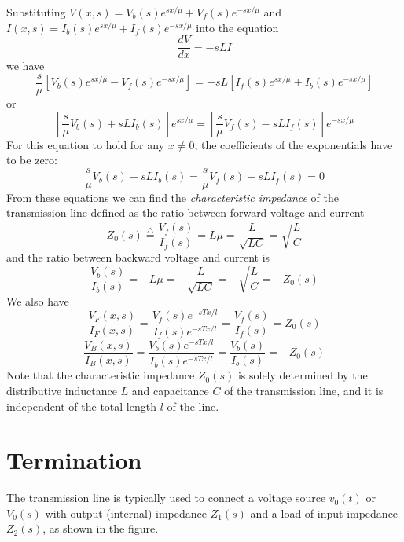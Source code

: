 Substituting $V(x,s)=V_b(s)e^{sx/\mu}+V_f(s)e^{-sx/\mu}$ and
$I(x,s)=I_b(s)e^{sx/\mu}+I_f(s)e^{-sx/\mu}$ into the equation
\[	\frac{dV}{dx}=-sLI	\]
we have
\[	\frac{s}{\mu}[V_b(s)e^{sx/\mu}-V_f(s)e^{-sx/\mu}]
	=-sL[I_f(s)e^{sx/\mu}+I_b(s)e^{-sx/\mu}]	\]
or 
\[ \left[\frac{s}{\mu}V_b(s)+sLI_b(s)\right]e^{sx/\mu}=
	\left[\frac{s}{\mu}V_f(s)-sLI_f(s)\right]e^{-sx/\mu}	\]
For this equation to hold for any $x\ne 0$, the coefficients of the
exponentials have to be zero:
\[	\frac{s}{\mu}V_b(s)+sLI_b(s)=\frac{s}{\mu}V_f(s)-sLI_f(s)=0 \]
From these equations we can find the {\em characteristic impedance} 
of the transmission line defined as the ratio between forward voltage 
and current
\[	Z_0(s)\stackrel{\triangle}{=}\frac{V_f(s)}{I_f(s)}
	=L\mu=\frac{L}{\sqrt{LC}}=\sqrt{\frac{L}{C}}	\]
and the ratio between backward voltage and current is
\[	\frac{V_b(s)}{I_b(s)}=-L\mu=-\frac{L}{\sqrt{LC}}
	=-\sqrt{\frac{L}{C}}=-Z_0(s)	\]
We also have
\[	\frac{V_F(x,s)}{I_F(x,s)}
	=\frac{V_f(s)e^{-sTx/l}}{I_f(s)e^{-sTx/l}}
	=\frac{V_f(s)}{I_f(s)}=Z_0(s)	\]
\[	\frac{V_B(x,s)}{I_B(x,s)}
	=\frac{V_b(s)e^{-sTx/l}}{I_b(s)e^{-sTx/l}}
	=\frac{V_b(s)}{I_b(s)}=-Z_0(s)	\]
Note that the characteristic impedance $Z_0(s)$ is solely determined by the
distributive inductance $L$ and capacitance $C$ of the transmission
line, and it is independent of the total length $l$ of the line.

\newpage
\section*{Termination}

The transmission line is typically used to connect a voltage source
$v_0(t)$ or $V_0(s)$ with output (internal) impedance $Z_1(s)$ and a
load of input impedance $Z_2(s)$, as shown in the figure. 


